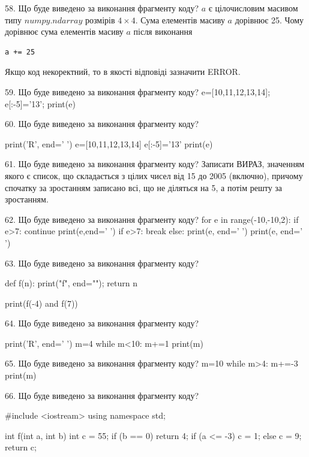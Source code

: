 \documentclass[11pt]{article}
\begin{document}
58. Що буде виведено за виконання фрагменту коду?
$a$ є цілочисловим масивом типу $numpy.ndarray$ розмірів $4{\times}4$. Сума елементів масиву $a$ дорівнює 25. Чому дорівнює сума елементів масиву $a$ після виконання 
\begin{verbatim}
a += 25
\end{verbatim}


Якщо код некоректний, то в якості відповіді зазначити ERROR.




59. Що буде виведено за виконання фрагменту коду?
e=[10,11,12,13,14]; e[:-5]='13'; print(e)

60. Що буде виведено за виконання фрагменту коду?

print('R', end=' ')
e=[10,11,12,13,14]
e[:-5]='13'
print(e)



61. Що буде виведено за виконання фрагменту коду?
Записати ВИРАЗ, значенням якого є список, що складається з цілих чисел від 15 до 2005 (включно), причому спочатку за зростанням записано всі, що не діляться на 5, а потім решту за зростанням.

62. Що буде виведено за виконання фрагменту коду?
for e in range(-10,-10,2):
    if e>7:
        continue
        print(e,end=' ')
    if e>7:
        break
else:
    print(e, end=' ')
print(e, end=' ')


63. Що буде виведено за виконання фрагменту коду?

def f(n):
    print("f", end="");
    return n

print(f(-4) and f(7))


64. Що буде виведено за виконання фрагменту коду?

print('R', end=' ')
m=4
while m<10:
    m+=1
print(m)



65. Що буде виведено за виконання фрагменту коду?
m=10
   while m>4: m+=-3
   print(m)

66. Що буде виведено за виконання фрагменту коду?

#include <iostream>
using namespace std;

int f(int a, int b){
    int c = 55;
    if (b == 0)
        return 4;
    if (a <= -3)
         c = 1;
    else 
        c = 9;
    return c;
}
\end{document}
